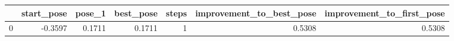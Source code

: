 \begin{tabular}{lrrrrrr}
\toprule
{} &  start\_pose &  pose\_1 &  best\_pose &  steps &  improvement\_to\_best\_pose &  improvement\_to\_first\_pose \\
\midrule
0 &     -0.3597 &  0.1711 &     0.1711 &      1 &                    0.5308 &                     0.5308 \\
\bottomrule
\end{tabular}
